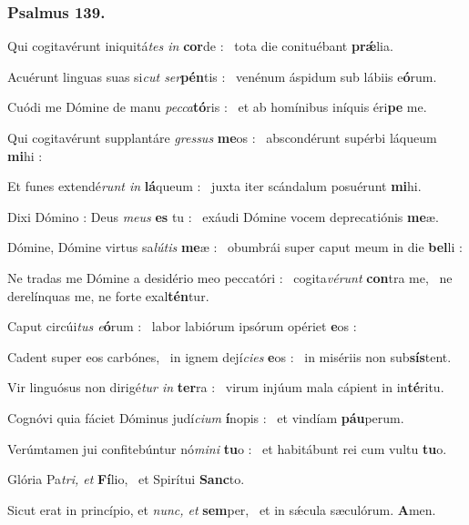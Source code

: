 \documentclass[12pt]{article} %
\def\noinitial{%
\gresetfirstlineaboveinitial{\textcolor{benred8}{\small \textsc{\textbf{}}}}{\textcolor{benred8}{\small \textsc{\textbf{}}}}
\setspaceafterinitial{0pt plus 0em minus 0em}%
\setspacebeforeinitial{0pt plus 0em minus 0em}%
\relax %
}
\newenvironment{psalmtext}{\leftskip 0.25in}{\vspace{2 mm}}
\let\oldgresixstar\gresixstar
\renewcommand{\gresixstar}{\textcolor{benred8}{\oldgresixstar}}
\let\oldgredagger\gredagger
\renewcommand{\gredagger}{\textcolor{benred8}{\oldgredagger}}
\begin{document}
\subsubsection*{Psalmus 139.}

{\noinitial
{}

}

\begin{psalmtext}
Qui cogitavérunt iniquitá\emph{tes in} \textbf{cor}de : \gresixstar\ tota die conituébant \textbf{prǽ}lia.

Acuérunt linguas suas si\emph{cut ser}\textbf{pén}tis : \gresixstar\ venénum áspidum sub lábiis e\textbf{ó}rum.

Cuódi me Dómine de manu \emph{pecca}\textbf{tó}ris : \gresixstar\ et ab homínibus iníquis éri\textbf{pe} me.

Qui cogitavérunt supplantáre \emph{gressus} \textbf{me}os : \gresixstar\ abscondérunt supérbi láqueum \textbf{mi}hi :

Et funes extendé\emph{runt in} \textbf{lá}queum : \gresixstar\ juxta iter scándalum posuérunt \textbf{mi}hi.

Dixi Dómino : Deus \emph{meus} \textbf{es} tu : \gresixstar\ exáudi Dómine vocem deprecatiónis \textbf{me}æ.

Dómine, Dómine virtus sa\emph{lútis} \textbf{me}æ : \gresixstar\ obumbrái super caput meum in die \textbf{bel}li :

Ne tradas me Dómine a desidério meo peccatóri : \gredagger\ cogita\emph{vérunt} \textbf{con}tra me, \gresixstar\ ne derelínquas me, ne forte exal\textbf{tén}tur.

Caput circúi\emph{tus e}\textbf{ó}rum : \gresixstar\ labor labiórum ipsórum opériet \textbf{e}os :

Cadent super eos carbónes, \gredagger\ in ignem dejí\emph{cies} \textbf{e}os : \gresixstar\ in misériis non sub\textbf{sís}tent.

Vir linguósus non dirigé\emph{tur in} \textbf{ter}ra : \gresixstar\ virum injúum mala cápient in in\textbf{té}ritu.

Cognóvi quia fáciet Dóminus judí\emph{cium} \textbf{í}nopis : \gresixstar\ et vindíam \textbf{páu}perum.

Verúmtamen jui confitebúntur nó\emph{mini} \textbf{tu}o : \gresixstar\ et habitábunt rei cum vultu \textbf{tu}o.

Glória Pa\emph{tri, et} \textbf{Fí}lio, \gresixstar\ et Spirítui \textbf{Sanc}to.

Sicut erat in princípio, et \emph{nunc, et} \textbf{sem}per, \gresixstar\ et in sǽcula sæculórum. \textbf{A}men.

\end{psalmtext}
\end{document}
